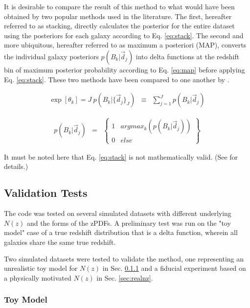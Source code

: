 \documentclass[preprint]{aastex}
\begin{document}
It is desirable to compare the result of this method to what would have been obtained by two popular methods used in the literature.   The first, hereafter referred to as stacking, directly calculates the posterior for the entire dataset using the posteriors for each galaxy according to Eq. \ref{eq:stack}.  \citep{lim08}  The second and more ubiquitous, hereafter referred to as maximum a posteriori (MAP), converts the individual galaxy posteriors $p(B_{k}|\vec{d}_{j})$ into delta functions at the redshift bin of maximum posterior probability according to Eq. \ref{eq:map} before applying Eq. \ref{eq:stack}.  These two methods have been compared to one another by \citet{hil11, ben12}.

\begin{eqnarray}
\label{eq:stack}
\exp[\theta_{k}] = J\ p(B_{k}|\{\vec{d}_{j}\}_{J}) &\equiv& \sum_{j=1}^{J}p(B_{k}|\vec{d}_{j})
\end{eqnarray}

\begin{eqnarray}
\label{eq:map}
p(B_{k}|\vec{d}_{j}) &=& \left\{\begin{array}{cc}1&argmax_{k}(p(B_{k}|\vec{d}_{j}))\\0&else\end{array}\right\}
\end{eqnarray}

It must be noted here that Eq. \ref{eq:stack} is not mathematically valid.  (See \citet{hog12} for details.)

\subsection{Validation Tests}
\label{sec:valid}

The code was tested on several simulated datasets with different underlying $N(z)$ and the forms of the zPDFs.  A preliminary test was run on the "toy model" case of a true redshift distribution that is a delta function, wherein all galaxies share the same true redshift.  

Two simulated datasets were tested to validate the method, one representing an unrealistic toy model for $N(z)$ in Sec. \ref{sec:fake} and a fiducial experiment based on a physically motivated $N(z)$ in Sec. \ref{sec:realnz}.%

\subsubsection{Toy Model}
\label{sec:fake}
\end{document}
